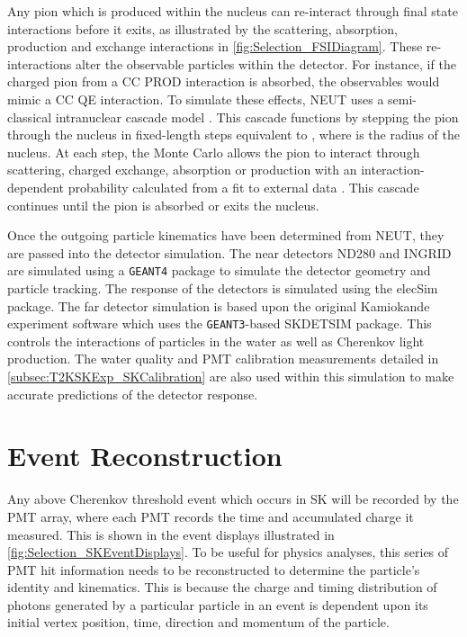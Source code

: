 Any pion which is produced within the nucleus can re-interact through final state interactions before it exits, as illustrated by the scattering, absorption, production and exchange interactions in \autoref{fig:Selection_FSIDiagram}. These re-interactions alter the observable particles within the detector. For instance, if the charged pion from a CC PROD interaction is absorbed, the observables would mimic a CC QE interaction. To simulate these effects, NEUT uses a semi-classical intranuclear cascade model \cite{Hayato2021}. This cascade functions by stepping the pion through the nucleus in fixed-length steps equivalent to , where  is the radius of the nucleus. At each step, the Monte Carlo allows the pion to interact through scattering, charged exchange, absorption or production with an interaction-dependent probability calculated from a fit to external data \cite{PhysRevD.99.052007}. This cascade continues until the pion is absorbed or exits the nucleus.

Once the outgoing particle kinematics have been determined from NEUT, they are passed into the detector simulation. The near detectors ND280 and INGRID are simulated using a \texttt{GEANT4} package \cite{t2k_det,geant4} to simulate the detector geometry and particle tracking. The response of the detectors is simulated using the elecSim package. The far detector simulation is based upon the original Kamiokande experiment software which uses the \texttt{GEANT3}-based SKDETSIM \cite{Brun:1987ma,t2k_det} package. This controls the interactions of particles in the water as well as Cherenkov light production. The water quality and PMT calibration measurements detailed in \autoref{subsec:T2KSKExp_SKCalibration} are also used within this simulation to make accurate predictions of the detector response.

\section{Event Reconstruction}
\label{sec:Simulation_Reconstruction}

Any above Cherenkov threshold event which occurs in SK will be recorded by the PMT array, where each PMT records the time and accumulated charge it measured. This is shown in the event displays illustrated in \autoref{fig:Selection_SKEventDisplays}. To be useful for physics analyses, this series of PMT hit information needs to be reconstructed to determine the particle's identity and kinematics. This is because the charge and timing distribution of photons generated by a particular particle in an event is dependent upon its initial vertex position, time, direction and momentum of the particle. 

